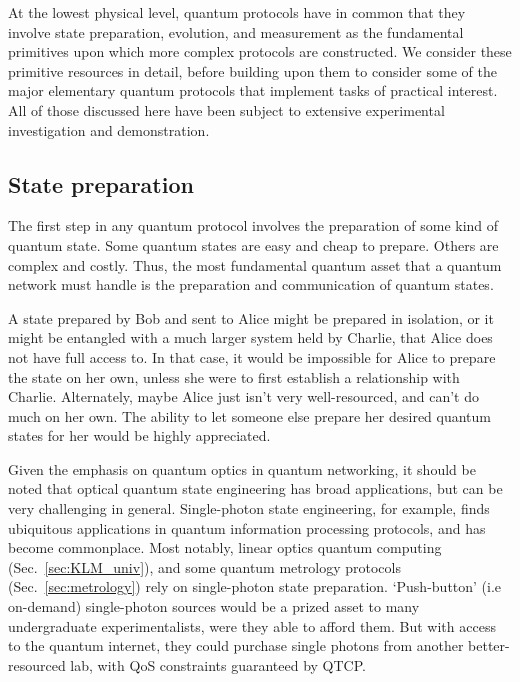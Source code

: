 \documentclass[aps,rmp,twocolumn,amsmath,amssymb,nofootinbib,superscriptaddress,longbibliography,floatfix]{revtex4-1}
\begin{document}
At the lowest physical level, quantum protocols have in common that they involve state preparation, evolution, and measurement as the fundamental primitives upon which more complex protocols are constructed. We consider these primitive resources in detail, before building upon them to consider some of the major elementary quantum protocols that implement tasks of practical interest. All of those discussed here have been subject to extensive experimental investigation and demonstration.

%
%

\subsection{State preparation}

The first step in any quantum protocol involves the preparation of some kind of quantum state. Some quantum states are easy and cheap to prepare. Others are complex and costly. Thus, the most fundamental quantum asset that a quantum network must handle is the preparation and communication of quantum states.

A state prepared by Bob and sent to Alice might be prepared in isolation, or it might be entangled with a much larger system held by Charlie, that Alice does not have full access to. In that case, it would be impossible for Alice to prepare the state on her own, unless she were to first establish a relationship with Charlie. Alternately, maybe Alice just isn't very well-resourced, and can't do much on her own. The ability to let someone else prepare her desired quantum states for her would be highly appreciated.

Given the emphasis on quantum optics in quantum networking, it should be noted that optical quantum state engineering has broad applications, but can be very challenging in general. Single-photon state engineering, for example, finds ubiquitous applications in quantum information processing protocols, and has become commonplace. Most notably, linear optics quantum computing (Sec.~\ref{sec:KLM_univ}), and some quantum metrology protocols (Sec.~\ref{sec:metrology}) rely on single-photon state preparation. `Push-button' (i.e on-demand) single-photon sources would be a prized asset to many undergraduate experimentalists, were they able to afford them. But with access to the quantum internet, they could purchase single photons from another better-resourced lab, with QoS constraints guaranteed by QTCP.
\end{document}
